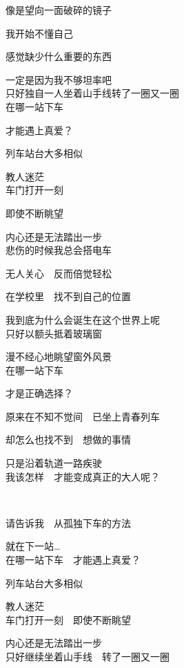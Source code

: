 像是望向一面破碎的镜子

我开始不懂自己

感觉缺少什么重要的东西

一定是因为我不够坦率吧
\\

只好独自一人坐着山手线转了一圈又一圈
\\

在哪一站下车

才能遇上真爱？

列车站台大多相似

教人迷茫
\\

车门打开一刻

即使不断眺望

内心还是无法踏出一步
\\

悲伤的时候我总会搭电车

无人关心　反而倍觉轻松

在学校里　找不到自己的位置

我到底为什么会诞生在这个世界上呢
\\

只好以额头抵着玻璃窗

漫不经心地眺望窗外风景
\\

在哪一站下车

才是正确选择？

原来在不知不觉间　已坐上青春列车

却怎么也找不到　想做的事情

只是沿着轨道一路疾驶
\\

我该怎样　才能变成真正的大人呢？


请告诉我　从孤独下车的方法

就在下一站…
\\

在哪一站下车　才能遇上真爱？

列车站台大多相似

教人迷茫
\\

车门打开一刻　即使不断眺望

内心还是无法踏出一步
\\

只好继续坐着山手线　转了一圈又一圈
\\

